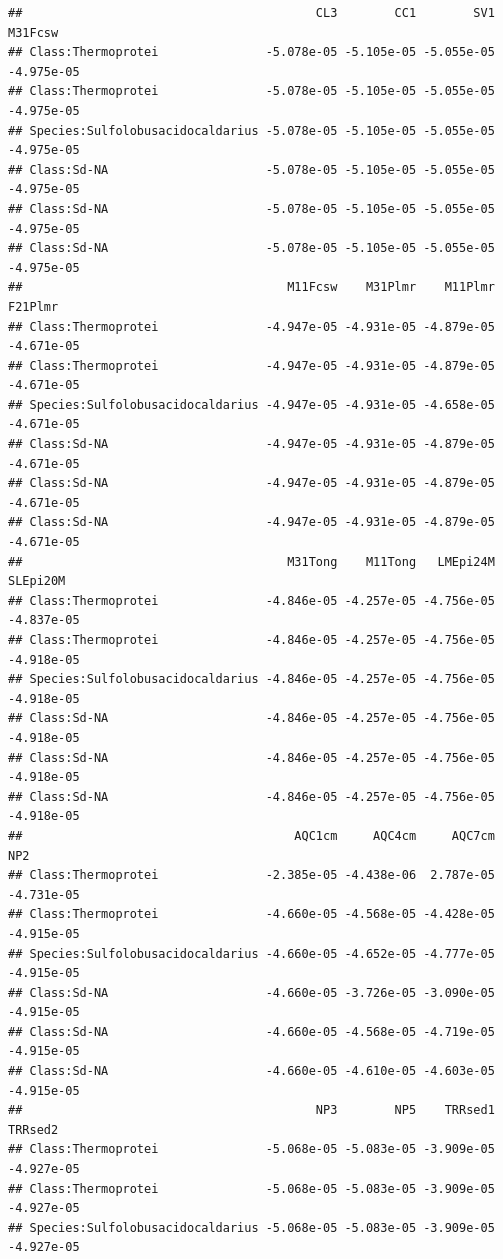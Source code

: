 \documentclass[
]{book}
\begin{document}
\begin{verbatim}
##                                         CL3        CC1        SV1    M31Fcsw
## Class:Thermoprotei               -5.078e-05 -5.105e-05 -5.055e-05 -4.975e-05
## Class:Thermoprotei               -5.078e-05 -5.105e-05 -5.055e-05 -4.975e-05
## Species:Sulfolobusacidocaldarius -5.078e-05 -5.105e-05 -5.055e-05 -4.975e-05
## Class:Sd-NA                      -5.078e-05 -5.105e-05 -5.055e-05 -4.975e-05
## Class:Sd-NA                      -5.078e-05 -5.105e-05 -5.055e-05 -4.975e-05
## Class:Sd-NA                      -5.078e-05 -5.105e-05 -5.055e-05 -4.975e-05
##                                     M11Fcsw    M31Plmr    M11Plmr    F21Plmr
## Class:Thermoprotei               -4.947e-05 -4.931e-05 -4.879e-05 -4.671e-05
## Class:Thermoprotei               -4.947e-05 -4.931e-05 -4.879e-05 -4.671e-05
## Species:Sulfolobusacidocaldarius -4.947e-05 -4.931e-05 -4.658e-05 -4.671e-05
## Class:Sd-NA                      -4.947e-05 -4.931e-05 -4.879e-05 -4.671e-05
## Class:Sd-NA                      -4.947e-05 -4.931e-05 -4.879e-05 -4.671e-05
## Class:Sd-NA                      -4.947e-05 -4.931e-05 -4.879e-05 -4.671e-05
##                                     M31Tong    M11Tong   LMEpi24M   SLEpi20M
## Class:Thermoprotei               -4.846e-05 -4.257e-05 -4.756e-05 -4.837e-05
## Class:Thermoprotei               -4.846e-05 -4.257e-05 -4.756e-05 -4.918e-05
## Species:Sulfolobusacidocaldarius -4.846e-05 -4.257e-05 -4.756e-05 -4.918e-05
## Class:Sd-NA                      -4.846e-05 -4.257e-05 -4.756e-05 -4.918e-05
## Class:Sd-NA                      -4.846e-05 -4.257e-05 -4.756e-05 -4.918e-05
## Class:Sd-NA                      -4.846e-05 -4.257e-05 -4.756e-05 -4.918e-05
##                                      AQC1cm     AQC4cm     AQC7cm        NP2
## Class:Thermoprotei               -2.385e-05 -4.438e-06  2.787e-05 -4.731e-05
## Class:Thermoprotei               -4.660e-05 -4.568e-05 -4.428e-05 -4.915e-05
## Species:Sulfolobusacidocaldarius -4.660e-05 -4.652e-05 -4.777e-05 -4.915e-05
## Class:Sd-NA                      -4.660e-05 -3.726e-05 -3.090e-05 -4.915e-05
## Class:Sd-NA                      -4.660e-05 -4.568e-05 -4.719e-05 -4.915e-05
## Class:Sd-NA                      -4.660e-05 -4.610e-05 -4.603e-05 -4.915e-05
##                                         NP3        NP5    TRRsed1    TRRsed2
## Class:Thermoprotei               -5.068e-05 -5.083e-05 -3.909e-05 -4.927e-05
## Class:Thermoprotei               -5.068e-05 -5.083e-05 -3.909e-05 -4.927e-05
## Species:Sulfolobusacidocaldarius -5.068e-05 -5.083e-05 -3.909e-05 -4.927e-05

\end{verbatim}
\end{document}
